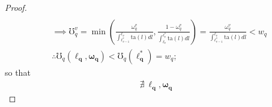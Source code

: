 \documentclass[hidelinks, nonatbib]{elsarticle}
\begin{document}
\begin{lemma}
\begin{proof}
\begin{align}
            \\
            &\implies
            \mho_{q}^{v} = 
            \min\left(
                \frac{
                    \omega_{q}^{v}
                }{
                    \int_{
                        \ell_{v-1}^{*}
                    }^{
                        \ell_{v}
                    }
                    \text{ta}(l)dl
                }
                ,
                \frac{
                    1-\omega_{q}^{v}
                }{
                    \int_{
                        \ell_{v}
                    }^{
                        \ell_{v}^{*}
                    }
                    \text{ta}(l)dl
                }
            \right)
            =
            \frac{
                \omega_{q}^{v}
            }{
                \int_{
                    \ell_{v-1}^{*}
                }^{
                    \ell_{v}
                }
                \text{ta}(l)dl
            }
            <
            w_q
            \\
            &\therefore
            \mho_{q}(
                \boldsymbol{\ell_q}
                ,\boldsymbol{\omega_q}
            ) 
            <
            \mho_{q}(
                \boldsymbol{\ell_{q}^{*}}
            )
            =
            w_q
            ;
        \end{align}
        so that 
        \begin{gather}
            \nexists
            \
            \boldsymbol{\ell_q}
            ,
            \boldsymbol{\omega_q}

\end{gather}
\end{proof}
\end{lemma}
\end{document}
